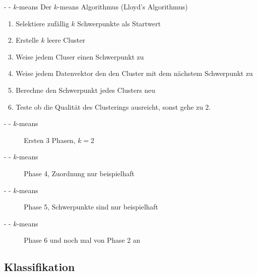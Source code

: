 \documentclass[fleqn,11pt,aspectratio=43]{beamer}
\begin{document}
\begin{frame}{\insertsectionhead - \insertsubsectionhead - $k$-means\cite{dwh}}
Der $k$-means Algorithmus (Lloyd's Algorithmus)
\begin{enumerate}
\item Selektiere zufällig $k$ Schwerpunkte als Startwert
\item Erstelle $k$ leere Cluster
\item Weise jedem Cluser einen Schwerpunkt zu
\item Weise jedem Datenvektor den den Cluster mit dem nächstem Schwerpunkt zu
\item Berechne den Schwerpunkt jedes Clusters neu
\item Teste ob die Qualität des Clusterings ausreicht, sonst gehe zu 2.
\end{enumerate}
\end{frame}

\begin{frame}{\insertsectionhead - \insertsubsectionhead - $k$-means}
\begin{figure}
\scalebox{1.1}{}
\caption{Ersten 3 Phasen, $k = 2$}
\end{figure}
\end{frame}

\begin{frame}{\insertsectionhead - \insertsubsectionhead - $k$-means}
\begin{figure}
\scalebox{1.1}{}
\caption{Phase 4, Zuordnung nur beispielhaft}
\end{figure}
\end{frame}

\begin{frame}{\insertsectionhead - \insertsubsectionhead - $k$-means}
\begin{figure}
\scalebox{1.1}{}
\caption{Phase 5, Schwerpunkte sind nur beispielhaft}
\end{figure}
\end{frame}

\begin{frame}{\insertsectionhead - \insertsubsectionhead - $k$-means}
\begin{figure}
\scalebox{1.1}{}
\caption{Phase 6 und noch mal von Phase 2 an}
\end{figure}
\end{frame}

\subsection{Klassifikation~}
\end{document}
